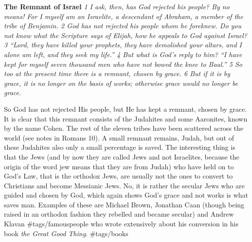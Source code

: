 \textbf{The Remnant of Israel} \emph{1 I ask, then, has God rejected his
people? By no means! For I myself am an Israelite, a descendant of
Abraham, a member of the tribe of Benjamin. 2 God has not rejected his
people whom he foreknew. Do you not know what the Scripture says of
Elijah, how he appeals to God against Israel? 3 ``Lord, they have killed
your prophets, they have demolished your altars, and I alone am left,
and they seek my life.'' 4 But what is God's reply to him? ``I have kept
for myself seven thousand men who have not bowed the knee to Baal.'' 5
So too at the present time there is a remnant, chosen by grace. 6 But if
it is by grace, it is no longer on the basis of works; otherwise grace
would no longer be grace.}

So God has not rejected His people, but He has kept a remnant, chosen by
grace. It is clear that this remnant consists of the Judahites and some
Aaronites, known by the name Cohen. The rest of the eleven tribes have
been scattered across the world (see notes in Romans 10). A small
remnant remains, Judah, but out of these Judahites also only a small
percentage is saved. The interesting thing is that the Jews (and by now
they are called Jews and not Israelites, because the origin of the word
jew means that they are from Judah) who have held on to God's Law, that
is the orthodox Jews, are usually not the ones to convert to Christians
and become Messianic Jews. No, it is rather the secular Jews who are
guided and chosen by God, which again shows God's grace and not works is
what saves man. Examples of these are Michael Brown, Jonathan Caan
(though being raised in an orthodox fashion they rebelled and became
secular) and Andrew Klavan \#tags/famouspeople who wrote extensively
about his conversion in his book \emph{the Great Good Thing}.
\#tags/books

